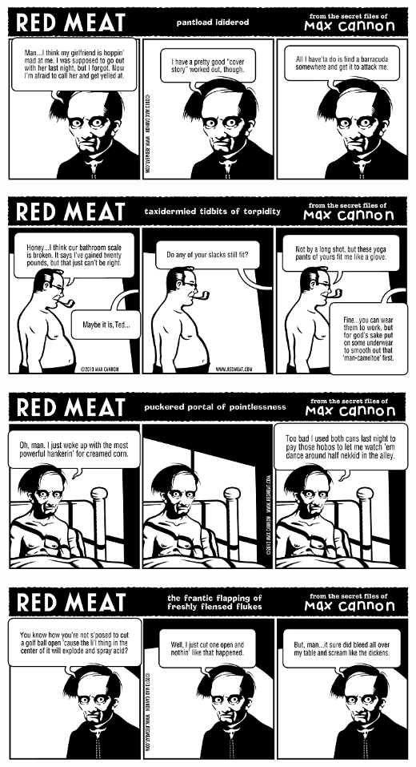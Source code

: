 \documentclass[a4paper,twoside,11pt]{article}
\begin{document}
\includegraphics[width=\textwidth]{redmeat_2013-09-17.png}



\includegraphics[width=\textwidth]{redmeat_2013-09-24.png}



\includegraphics[width=\textwidth]{redmeat_2013-10-01.png}



\includegraphics[width=\textwidth]{redmeat_2013-10-08.png}
\end{document}
